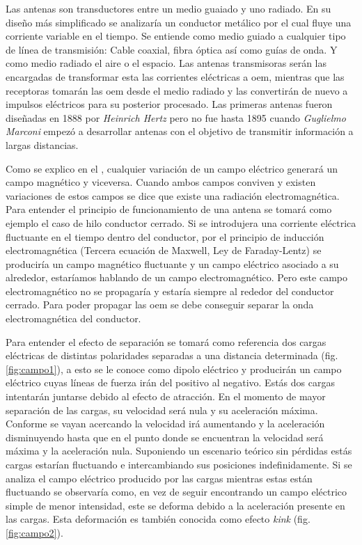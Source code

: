 \par Las antenas son transductores entre un medio guaiado y uno radiado. En su diseño más simplificado se analizaría un conductor metálico por el cual fluye una corriente variable en el tiempo. Se entiende como medio guiado a cualquier tipo de línea de transmisión: Cable coaxial, fibra óptica así como guías de onda. Y como medio radiado el aire o el espacio. Las antenas transmisoras serán las encargadas de transformar esta las corrientes eléctricas a \gls{oem}, mientras que las receptoras tomarán las \gls{oem} desde el medio radiado y las convertirán de nuevo a impulsos eléctricos para su posterior procesado. Las primeras antenas fueron diseñadas en 1888 por \textit{Heinrich Hertz} pero no fue hasta 1895 cuando \textit{Guglielmo Marconi} empezó a desarrollar antenas con el objetivo de transmitir información a largas distancias.
\\
\par Como se explico en el , cualquier variación de un campo eléctrico generará un campo magnético y viceversa. Cuando ambos campos conviven y existen variaciones de estos campos se dice que existe una radiación electromagnética. Para entender el principio de funcionamiento de una antena se tomará como ejemplo el caso de hilo conductor cerrado. Si se introdujera una corriente eléctrica fluctuante en el tiempo dentro del conductor, por el principio de inducción electromagnética (Tercera ecuación de Maxwell, Ley de Faraday-Lentz) se produciría un campo magnético fluctuante y un campo eléctrico asociado a su alrededor, estaríamos hablando de un campo electromagnético. Pero este campo electromagnético no se propagaría y estaría siempre al rededor del conductor cerrado. Para poder propagar las \gls{oem} se debe conseguir separar la onda electromagnética del conductor.
\\
\par Para entender el efecto de separación se tomará como referencia dos cargas eléctricas de distintas polaridades separadas a una distancia determinada (fig. \ref{fig:campo1}), a esto se le conoce como dipolo eléctrico y producirán un campo eléctrico cuyas líneas de fuerza irán del positivo al negativo. Estás dos cargas intentarán juntarse debido al efecto de atracción. En el momento de mayor separación de las cargas, su velocidad será nula y su aceleración máxima. Conforme se vayan acercando la velocidad irá aumentando y la aceleración disminuyendo hasta que en el punto donde se encuentran la velocidad será máxima y la aceleración nula. Suponiendo un escenario teórico sin pérdidas estás cargas estarían fluctuando e intercambiando sus posiciones indefinidamente. Si se analiza el campo eléctrico producido por las cargas mientras estas están fluctuando se observaría como, en vez de seguir encontrando un campo eléctrico simple de menor intensidad, este se deforma debido a la aceleración presente en las cargas. Esta deformación es también conocida como efecto \textit{kink} (fig. \ref{fig:campo2}).

